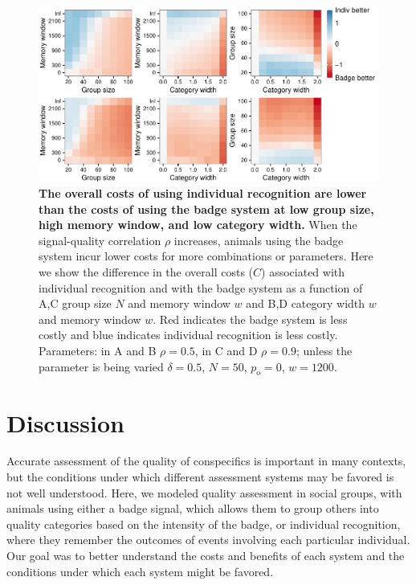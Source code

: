 \begin{figure}
\includegraphics[width=6.85in]{figures/cost_comparisons.pdf}
\caption{\sffamily\small\textbf{The overall costs of using individual recognition are lower than the costs of using the badge system at low group size, high memory window, and low category width.} When the signal-quality correlation $\rho$ increases, animals using the badge system incur lower costs for more combinations or parameters. Here we show the difference in the overall costs ($C$) associated with individual recognition and with the badge system as a function of A,C group size $N$ and memory window $w$ and B,D category width $w$ and memory window $w$. Red indicates the badge system is less costly and blue indicates individual recognition is less costly. Parameters: in A and B $\rho=0.5$, in C and D $\rho=0.9$; unless the parameter is being varied $\delta = 0.5$, $N=50$, $p_\text{o}=0$, $w=1200$.}
\label{comparison}
\end{figure}

\section*{Discussion}
Accurate assessment of the quality of conspecifics is important in many contexts, but the conditions under which different assessment systems may be favored is not well understood. Here, we modeled quality assessment in social groups, with animals using either a badge signal, which allows them to group others into quality categories based on the intensity of the badge, or individual recognition, where they remember the outcomes of events involving each particular individual. Our goal was to better understand the costs and benefits of each system and the conditions under which each system might be favored. 

